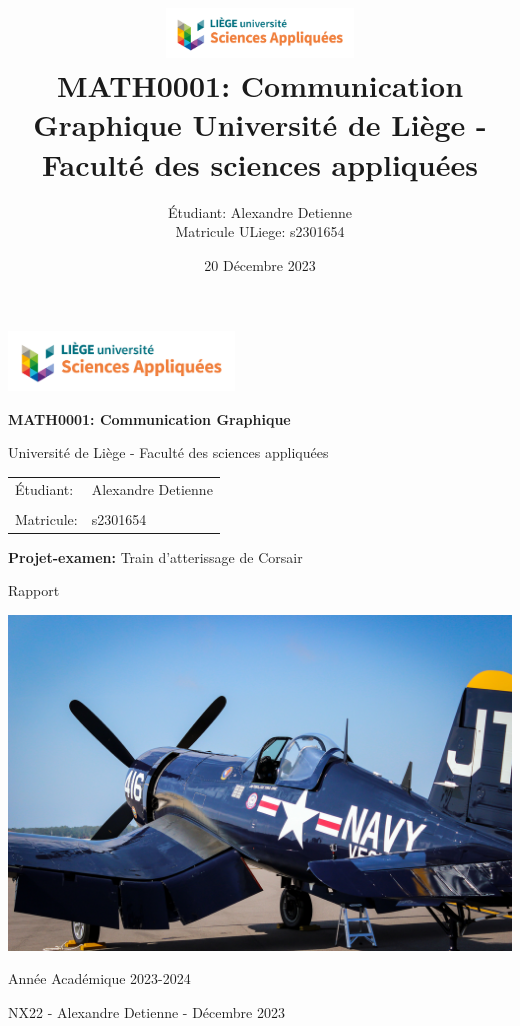 \documentclass{article}
\title
{
    \includegraphics[width=5cm]{uliege_logo.png}\\[1cm]

    \textbf{MATH0001: Communication Graphique}
    \large Université de Liège - Faculté des sciences appliquées
    }
\author{Étudiant: Alexandre Detienne\\
Matricule ULiege: s2301654}
\date{20 Décembre 2023}
\begin{document}
\begin{titlepage}
    \begin{flushleft}
        \includegraphics[width=6cm]{uliege_logo.png}
    \end{flushleft}
    \begin{center}
        \vspace{2cm}

        \LARGE{\textbf{MATH0001: Communication Graphique}}

        \vspace{0.5cm}

        \large{Université de Liège - Faculté des sciences appliquées}

        \vspace{0.5cm}

        \begin{tabular}{l l}
            Étudiant: & Alexandre Detienne\\
            \\
            Matricule: & s2301654\\
        \end{tabular}

        \vspace{2cm}

        \LARGE{\textbf{Projet-examen:} Train d'atterissage de Corsair}

        \vspace{1cm}

        Rapport
    
        \vspace{1.5cm}

        \includegraphics[width = 0.8\linewidth]{corsair_image_frontpage.jpg}

        \vspace{1cm}
    \end{center}

    \begin{flushleft}
        Année Académique 2023-2024

        NX22 - Alexandre Detienne - Décembre 2023
    \end{flushleft}
\end{titlepage}
\end{document}
